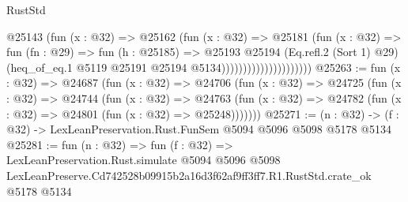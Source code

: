 \begin{lexlean}{RustStd}
\begin{coremodule}
                                    @25143
                                      (fun (x : @32) =>
                                      @25162
                                        (fun (x : @32) =>
                                        @25181
                                          (fun (x : @32) =>
                                          fun (fn : @29) =>
                                          fun (h : @25185) =>
                                          @25193
                                            @25194
                                            (Eq.refl.{2} (Sort 1) @29)
                                            (heq_of_eq.{1}
                                              @5119
                                              @25191
                                              @25194
                                              @5134)))))))))))))))))))))
@25263 := fun (x : @32) =>
  @24687
    (fun (x : @32) =>
    @24706
      (fun (x : @32) =>
      @24725
        (fun (x : @32) =>
        @24744
          (fun (x : @32) =>
          @24763 (fun (x : @32) => @24782 (fun (x : @32) => @24801 (fun (x : @32) => @25248)))))))
@25271 := (n : @32) -> (f : @32) -> LexLeanPreservation.Rust.FunSem @5094 @5096 @5098 @5178 @5134
@25281 := fun (n : @32) =>
  fun (f : @32) =>
  LexLeanPreservation.Rust.simulate
    @5094
    @5096
    @5098
    LexLeanPreserve.Cd742528b09915b2a16d3f62af9ff3ff7.R1.RustStd.crate_ok
    @5178
    @5134
\end{coremodule}
\end{lexlean}

